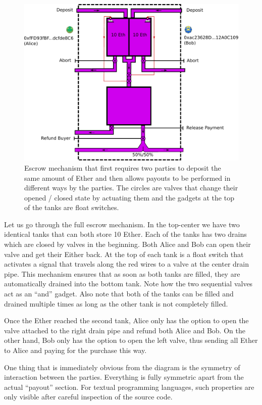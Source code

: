 \documentclass[11pt,letterpaper]{article}
\begin{document}
\begin{figure}
\center
\includegraphics[width=12cm]{escrow.pdf}
\caption{Escrow mechanism that first requires two parties to deposit the same
amount of Ether and then allows payouts to be performed in different ways
by the parties. The circles are valves that change their opened / closed
state by actuating them and the gadgets at the top of the tanks are
float switches.}
\label{escrow}
\end{figure}

Let us go through the full escrow mechanism. In the top-center we have two
identical tanks that can both store 10 Ether. Each of the tanks has two
drains which are closed by valves in the beginning. Both Alice and Bob can
open their valve and get their Either back. At the top of each tank
is a float switch that activates a signal that travels along the red wires
to a valve at the center drain pipe. This mechanism ensures that as soon as
both tanks are filled, they are automatically drained into the bottom tank.
Note how the two sequential valves act as an ``and'' gadget. Also note that
both of the tanks can be filled and drained multiple times as long as the
other tank is not completely filled.

Once the Ether reached the second tank, Alice only has the option to open
the valve attached to the right drain pipe and refund both Alice and Bob.
On the other hand, Bob only has the option to open the left valve, thus
sending all Ether to Alice and paying for the purchase this way.

One thing that is immediately obvious from the diagram is the symmetry of
interaction between the parties. Everything is fully symmetric apart from
the actual ``payout'' section. For textual programming languages, such
properties are only visible after careful inspection of the source code.
\end{document}
